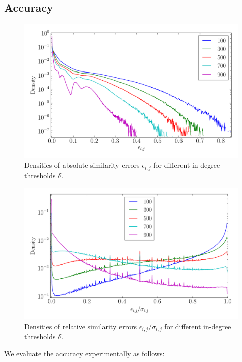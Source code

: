 \documentclass{kais}
\begin{document}
\subsection{Accuracy}
\label{sec: accuracy}

\begin{figure}
\centerline{\includegraphics[width=0.75\columnwidth]{figures/1446451652-absolute_error.pdf}}
\caption{Densities of absolute similarity errors $\epsilon_{i,j}$ for different in-degree thresholds $\delta$.}
\label{fig:abs-error}
\end{figure}

\begin{figure}
\centerline{\includegraphics[width=0.75\columnwidth]{figures/1446451652-relative_error.pdf}}
\caption{Densities of relative similarity errors $\epsilon_{i,j}/\sigma_{i,j}$ for different 
in-degree thresholds $\delta$.}
\label{fig:rel-error}
\end{figure}

We evaluate the accuracy experimentally as follows:
\end{document}
